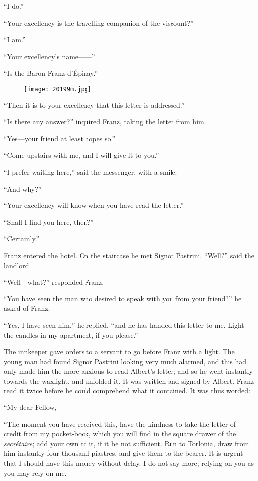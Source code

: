 “I do.”

“Your excellency is the travelling companion of the viscount?”

“I am.”

“Your excellency’s name——”

“Is the Baron Franz d’Épinay.”

\begin{figure}[h]
\texttt{[image: 20199m.jpg]}
\end{figure}

“Then it is to your excellency that this letter is addressed.”

“Is there any answer?” inquired Franz, taking the letter from him.

“Yes—your friend at least hopes so.”

“Come upstairs with me, and I will give it to you.”

“I prefer waiting here,” said the messenger, with a smile.

“And why?”

“Your excellency will know when you have read the letter.”

“Shall I find you here, then?”

“Certainly.”

Franz entered the hotel. On the staircase he met Signor Pastrini.
“Well?” said the landlord.

“Well—what?” responded Franz.

“You have seen the man who desired to speak with you from your friend?”
he asked of Franz.

“Yes, I have seen him,” he replied, “and he has handed this letter to
me. Light the candles in my apartment, if you please.”

The innkeeper gave orders to a servant to go before Franz with a light.
The young man had found Signor Pastrini looking very much alarmed, and
this had only made him the more anxious to read Albert’s letter; and so
he went instantly towards the waxlight, and unfolded it. It was written
and signed by Albert. Franz read it twice before he could comprehend
what it contained. It was thus worded:

“My dear Fellow,

“The moment you have received this, have the kindness to take the
letter of credit from my pocket-book, which you will find in the square
drawer of the \textit{secrétaire}; add your own to it, if it be not
sufficient. Run to Torlonia, draw from him instantly four thousand
piastres, and give them to the bearer. It is urgent that I should have
this money without delay. I do not say more, relying on you as you may
rely on me.

